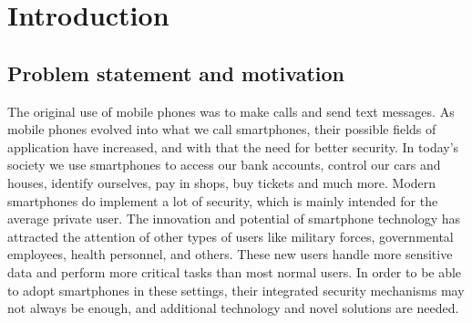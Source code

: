 \chapter{Introduction}
\section{Problem statement and motivation}
The original use of mobile phones was to make calls and send text messages. As mobile phones evolved into what we call smartphones, their possible fields of application have increased, and with that the need for better security. In today's society we use smartphones to access our bank accounts, control our cars and houses, identify ourselves, pay in shops, buy tickets and much more. Modern smartphones do implement a lot of security, which is mainly intended for the average private user. The innovation and potential of smartphone technology has attracted the attention of other types of users like military forces, governmental employees, health personnel, and others. These new users handle more sensitive data and perform more critical tasks than most normal users. In order to be able to adopt smartphones in these settings, their integrated security mechanisms may not always be enough, and additional technology and novel solutions are needed.



